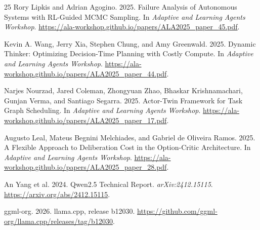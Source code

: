 \documentclass[sigconf,nonacm]{acmart}
\begin{document}
\begin{thebibliography}{25}
Rory Lipkis and Adrian Agogino. 2025.
Failure Analysis of Autonomous Systems with RL-Guided MCMC Sampling.
In \emph{Adaptive and Learning Agents Workshop}.
\url{https://ala-workshop.github.io/papers/ALA2025_paper_45.pdf}.

Kevin A. Wang, Jerry Xia, Stephen Chung, and Amy Greenwald. 2025.
Dynamic Thinker: Optimizing Decision-Time Planning with Costly Compute.
In \emph{Adaptive and Learning Agents Workshop}.
\url{https://ala-workshop.github.io/papers/ALA2025_paper_44.pdf}.

Narjes Nourzad, Jared Coleman, Zhongyuan Zhao, Bhaskar Krishnamachari,
Gunjan Verma, and Santiago Segarra. 2025.
Actor-Twin Framework for Task Graph Scheduling.
In \emph{Adaptive and Learning Agents Workshop}.
\url{https://ala-workshop.github.io/papers/ALA2025_paper_17.pdf}.

Augusto Leal, Mateus Begnini Melchiades, and Gabriel de Oliveira Ramos. 2025.
A Flexible Approach to Deliberation Cost in the Option-Critic Architecture.
In \emph{Adaptive and Learning Agents Workshop}.
\url{https://ala-workshop.github.io/papers/ALA2025_paper_28.pdf}.

An Yang et al. 2024.
Qwen2.5 Technical Report. \emph{arXiv:2412.15115}.
\url{https://arxiv.org/abs/2412.15115}.

ggml-org. 2026.
llama.cpp, release b12030. \url{https://github.com/ggml-org/llama.cpp/releases/tag/b12030}.
\end{thebibliography}
\ifdefined\shortversion
\else
\clearpage
\onecolumn
\appendix

\fi
\end{document}
